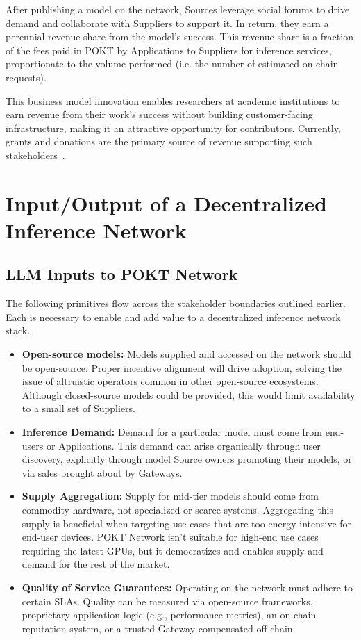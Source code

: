 \documentclass[conference,compsoc]{IEEEtran}
\begin{document}
After publishing a model on the network, Sources leverage social forums to drive demand and collaborate with Suppliers to support it. In return, they earn a perennial revenue share from the model's success. This revenue share is a fraction of the fees paid in POKT by Applications to Suppliers for inference services, proportionate to the volume performed (i.e. the number of estimated on-chain requests).

This business model innovation enables researchers at academic institutions to earn revenue from their work's success without building customer-facing infrastructure, making it an attractive opportunity for contributors. Currently, grants and donations are the primary source of revenue supporting such stakeholders~\cite{lmsysDonationsLMSYS}.





\section{Input/Output of a Decentralized Inference Network}

\subsection{LLM Inputs to POKT Network}
The following primitives flow across the stakeholder boundaries outlined earlier. Each is necessary to enable and add value to a decentralized inference network stack.

\begin{itemize}
    \item \textbf{Open-source models:} Models supplied and accessed on the network should be open-source. Proper incentive alignment will drive adoption, solving the issue of altruistic operators common in other open-source ecosystems. Although closed-source models could be provided, this would limit availability to a small set of Suppliers.

    \item \textbf{Inference Demand:} Demand for a particular model must come from end-users or Applications. This demand can arise organically through user discovery, explicitly through model Source owners promoting their models, or via sales brought about by Gateways.

    \item \textbf{Supply Aggregation:} Supply for mid-tier models should come from commodity hardware, not specialized or scarce systems. Aggregating this supply is beneficial when targeting use cases that are too energy-intensive for end-user devices. POKT Network isn't suitable for high-end use cases requiring the latest GPUs, but it democratizes and enables supply and demand for the rest of the market.

    \item \textbf{Quality of Service Guarantees:} Operating on the network must adhere to certain SLAs. Quality can be measured via open-source frameworks, proprietary application logic (e.g., performance metrics), an on-chain reputation system, or a trusted Gateway compensated off-chain.

\end{itemize}
\end{document}
